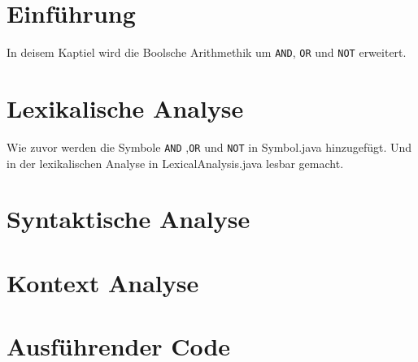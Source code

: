 \section{Einführung}
In deisem Kaptiel wird die Boolsche Arithmethik um \verb|AND|, \verb|OR| und \verb|NOT| erweitert.

\section{Lexikalische Analyse}
Wie zuvor werden die Symbole \verb|AND| ,\verb|OR| und \verb|NOT| in Symbol.java hinzugefügt.
Und in der lexikalischen Analyse in LexicalAnalysis.java lesbar gemacht.



\section{Syntaktische Analyse}

\section{Kontext Analyse}

\section{Ausführender Code}


